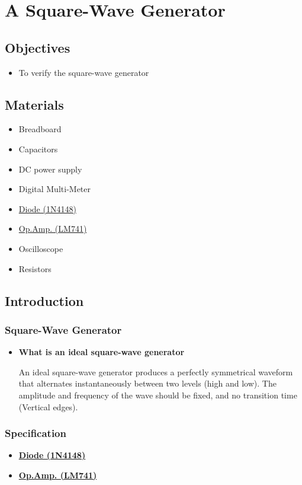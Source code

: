 \chapter{A Square-Wave Generator}


\section{Objectives}
\begin{itemize}
    \item To verify the square-wave generator
\end{itemize}

\section{Materials}
\begin{itemize}
    \item Breadboard
    \item Capacitors
    \item DC power supply
    \item Digital Multi-Meter
    \item \hyperref[1N4148]{Diode (1N4148)}
    \item \hyperref[LM741_1]{Op.Amp. (LM741)}
    \item Oscilloscope
    \item Resistors
\end{itemize}

\section{Introduction}
    \subsection{Square-Wave Generator}
        \begin{itemize}
            \item \textbf{What is an ideal square-wave generator}\par
            An ideal square-wave generator produces a perfectly symmetrical waveform that alternates instantaneously between two levels (high and low). The amplitude and frequency of the wave should be fixed, and no transition time (Vertical edges).
        \end{itemize}
    \FloatBarrier
    \subsection{Specification}
        \begin{itemize}
            \item \hyperref[1N4148]{\textbf{Diode (1N4148)}}
            \item \hyperref[LM741_1]{\textbf{Op.Amp. (LM741)}}
        \end{itemize}
